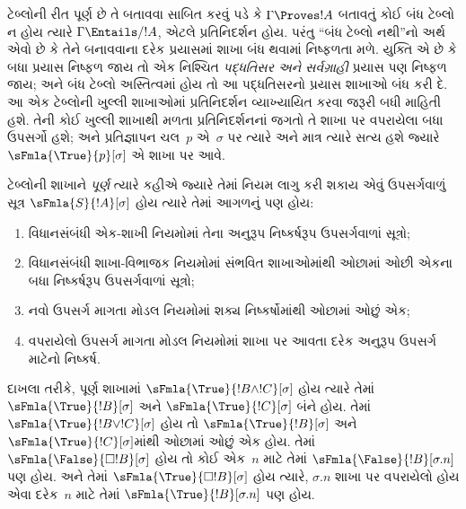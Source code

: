 \begingroup
\makeatletter{}\makeatother


\label{guunit:OLP-0468}


\begin{explain}
  ટેબ્લોની રીત પૂર્ણ છે તે બતાવવા સાબિત કરવું પડે કે
  $\Gamma \Proves !A$ બતાવતું કોઈ બંધ ટેબ્લો ન હોય ત્યારે
  $\Gamma \Entails/ !A$, એટલે પ્રતિનિદર્શન હોય. પરંતુ ``બંધ
  ટેબ્લો નથી''નો અર્થ એવો છે કે તેને બનાવવાના દરેક પ્રયાસમાં
  શાખા બંધ થવામાં નિષ્ફળતા મળે. યુક્તિ એ છે કે બધા પ્રયાસ નિષ્ફળ
  જાય તો એક નિશ્ચિત \emph{પદ્ધતિસર અને સર્વગ્રાહી} પ્રયાસ પણ
  નિષ્ફળ જાય; અને બંધ ટેબ્લો અસ્તિત્વમાં હોય તો આ
  પદ્ધતિસરનો પ્રયાસ શાખાઓ બંધ કરી દે. આ એક ટેબ્લોની ખુલ્લી
  શાખાઓમાં પ્રતિનિદર્શન વ્યાખ્યાયિત કરવા જરૂરી બધી માહિતી હશે.
  તેની કોઈ ખુલ્લી શાખાથી મળતા પ્રતિનિદર્શનનાં જગતો તે શાખા પર
  વપરાયેલા બધા ઉપસર્ગો હશે; અને પ્રતિજ્ઞાપન ચલ~$p$ એ~$\sigma$ પર ત્યારે અને માત્ર ત્યારે સત્ય હશે
  જ્યારે $\sFmla{\True}{p}[\sigma]$ એ શાખા પર આવે.
\end{explain}

\begin{defn}
  ટેબ્લોની શાખાને \emph{પૂર્ણ} ત્યારે કહીએ જ્યારે તેમાં
  નિયમ લાગુ કરી શકાય એવું ઉપસર્ગવાળું સૂત્ર
  $\sFmla{S}{!A}[\sigma]$ હોય ત્યારે તેમાં આગળનું પણ હોય:
  \begin{enumerate}
    \item વિધાનસંબંધી એક-શાખી નિયમોમાં તેના અનુરૂપ નિષ્કર્ષરૂપ
      ઉપસર્ગવાળાં સૂત્રો;
    \item વિધાનસંબંધી શાખા-વિભાજક નિયમોમાં સંભવિત
      શાખાઓમાંથી ઓછામાં ઓછી એકના બધા નિષ્કર્ષરૂપ
      ઉપસર્ગવાળાં સૂત્રો;
    \item નવો ઉપસર્ગ માગતા મોડલ નિયમોમાં શક્ય નિષ્કર્ષોમાંથી
      ઓછામાં ઓછું એક;
    \item વપરાયેલો ઉપસર્ગ માગતા મોડલ નિયમોમાં શાખા પર આવતા
      દરેક અનુરૂપ ઉપસર્ગ માટેનો નિષ્કર્ષ.
  \end{enumerate}
\end{defn}

\begin{explain}
દાખલા તરીકે, પૂર્ણ શાખામાં $\sFmla{\True}{!B \land !C}[\sigma]$
હોય ત્યારે તેમાં $\sFmla{\True}{!B}[\sigma]$ અને
$\sFmla{\True}{!C}[\sigma]$ બંને હોય. તેમાં
$\sFmla{\True}{!B \lor !C}[\sigma]$ હોય તો
$\sFmla{\True}{!B}[\sigma]$ અને
$\sFmla{\True}{!C}[\sigma]$માંથી ઓછામાં ઓછું એક હોય.
તેમાં $\sFmla{\False}{\Box !B}[\sigma]$ હોય તો કોઈ એક~$n$
માટે તેમાં $\sFmla{\False}{!B}[\sigma.n]$ પણ હોય. અને તેમાં
$\sFmla{\True}{\Box !B}[\sigma]$ હોય ત્યારે,
$\sigma.n$ શાખા પર વપરાયેલો હોય એવા દરેક~$n$ માટે તેમાં
$\sFmla{\True}{!B}[\sigma.n]$ પણ હોય.
\end{explain}

